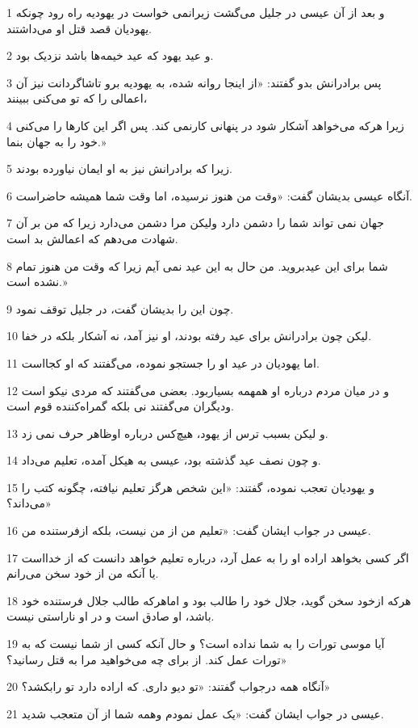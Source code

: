 \par 1 و بعد از آن عیسی در جلیل می‌گشت زیرانمی خواست در یهودیه راه رود چونکه یهودیان قصد قتل او می‌داشتند.
\par 2 و عید یهود که عید خیمه‌ها باشد نزدیک بود.
\par 3 پس برادرانش بدو گفتند: «از اینجا روانه شده، به یهودیه برو تاشاگردانت نیز آن اعمالی را که تو می‌کنی ببینند،
\par 4 زیرا هر‌که می‌خواهد آشکار شود در پنهانی کارنمی کند. پس اگر این کارها را می‌کنی خود را به جهان بنما.»
\par 5 زیرا که برادرانش نیز به او ایمان نیاورده بودند.
\par 6 آنگاه عیسی بدیشان گفت: «وقت من هنوز نرسیده، اما وقت شما همیشه حاضراست.
\par 7 جهان نمی تواند شما را دشمن دارد ولیکن مرا دشمن می‌دارد زیرا که من بر آن شهادت می‌دهم که اعمالش بد است.
\par 8 شما برای این عیدبروید. من حال به این عید نمی آیم زیرا که وقت من هنوز تمام نشده است.»
\par 9 چون این را بدیشان گفت، در جلیل توقف نمود.
\par 10 لیکن چون برادرانش برای عید رفته بودند، او نیز آمد، نه آشکار بلکه در خفا.
\par 11 اما یهودیان در عید او را جستجو نموده، می‌گفتند که او کجااست.
\par 12 و در میان مردم درباره او همهمه بسیاربود. بعضی می‌گفتند که مردی نیکو است ودیگران می‌گفتند نی بلکه گمراه‌کننده قوم است.
\par 13 و لیکن بسبب ترس از یهود، هیچ‌کس درباره اوظاهر حرف نمی زد.
\par 14 و چون نصف عید گذشته بود، عیسی به هیکل آمده، تعلیم می‌داد.
\par 15 و یهودیان تعجب نموده، گفتند: «این شخص هرگز تعلیم نیافته، چگونه کتب را می‌داند؟»
\par 16 عیسی در جواب ایشان گفت: «تعلیم من از من نیست، بلکه ازفرستنده من.
\par 17 اگر کسی بخواهد اراده او را به عمل آرد، درباره تعلیم خواهد دانست که از خدااست یا آنکه من از خود سخن می‌رانم.
\par 18 هر‌که ازخود سخن گوید، جلال خود را طالب بود و اماهر‌که طالب جلال فرستنده خود باشد، او صادق است و در او ناراستی نیست.
\par 19 آیا موسی تورات را به شما نداده است؟ و حال آنکه کسی از شما نیست که به تورات عمل کند. از برای چه می‌خواهید مرا به قتل رسانید؟»
\par 20 آنگاه همه درجواب گفتند: «تو دیو داری. که اراده دارد تو رابکشد؟»
\par 21 عیسی در جواب ایشان گفت: «یک عمل نمودم وهمه شما از آن متعجب شدید.
